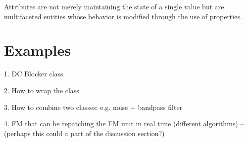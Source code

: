 \documentclass[twoside,10pt]{article}
\begin{document}
Attributes are not merely maintaining the state of a single value but are multifaceted entities whose behavior is modified through the use of properties\cite{Place:2008params}.


%
%
%
%
%		





\section{Examples} %

1. DC Blocker class

2. How to wrap the class

3. How to combine two classes: e.g. noise + bandpass filter

4. FM that can be repatching the FM unit in real time (different algorithms)  -- (perhaps this could a part of the discussion section?) 







\end{document}
